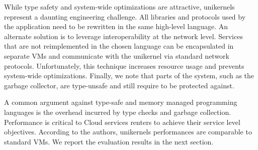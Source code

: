 While type safety and system-wide optimizations are attractive, unikernels represent a daunting engineering challenge.
All libraries and protocols used by the application need to be rewritten in the same high-level language.
An alternate solution is to leverage interoperability at the network level.
Services that are not reimplemented in the chosen language can be encapsulated in separate VMs and communicate with the unikernel via standard network protocols.
Unfortunately, this technique increases resource usage and prevents system-wide optimizations.
Finally, we note that parts of the system, such as the garbage collector, are type-unsafe and still require to be protected against. 

A common argument against type-safe and memory managed programming languages is the overhead incurred by type checks and garbage collection.
Performance is critical to Cloud services renters to achieve their service level objectives.
According to the authors, unikernels performances are comparable to standard VMs.
We report the evaluation results \cite{DBLP:conf/asplos/MadhavapeddyMRSSGSHC13} in the next section.

